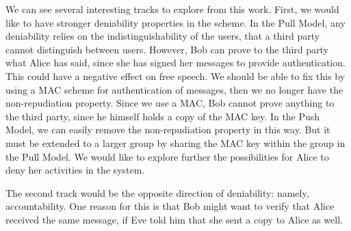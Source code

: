 We can see several interesting tracks to explore from this work.
First, we would like to have stronger deniability properties in the scheme.
In the Pull Model, any deniability relies on the indistinguishability of the 
users, that a third party cannot distinguish between users.
However, Bob can prove to the third party what Alice has said, since she has 
signed her messages to provide authentication.
This could have a negative effect on free speech.
We should be able to fix this by using a \ac{MAC} scheme for authentication of 
messages, then we no longer have the non-repudiation property.
Since we use a \ac{MAC}, Bob cannot prove anything to the third party, since he 
himself holds a copy of the \ac{MAC} key.
In the Push Model, we can easily remove the non-repudiation property in this 
way.
But it must be extended to a larger group by sharing the \ac{MAC} key within 
the group in the Pull Model.
We would like to explore further the possibilities for Alice to deny her 
activities in the system.

The second track would be the opposite direction of deniability: namely, 
accountability.
One reason for this is that Bob might want to verify that Alice received the 
same message, if Eve told him that she sent a copy to Alice as well.





\begin{frame}
\printbibliography{}
\end{frame}
